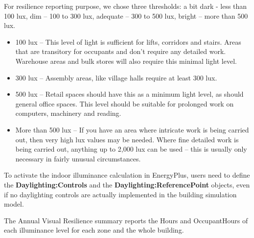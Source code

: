For resilience reporting purpose, we chose three thresholds: a bit dark - less than 100 lux, dim – 100 to 300 lux, adequate – 300 to 500 lux, bright – more than 500 lux.

\begin{itemize}
\item 100 lux – This level of light is sufficient for lifts, corridors and stairs. Areas that are transitory for occupants and don’t require any detailed work. Warehouse areas and bulk stores will also require this minimal light level.
\item 300 lux – Assembly areas, like village halls require at least 300 lux.
\item 500 lux – Retail spaces should have this as a minimum light level, as should general office spaces. This level should be suitable for prolonged work on computers, machinery and reading.
\item More than 500 lux – If you have an area where intricate work is being carried out, then very high lux values may be needed. Where fine detailed work is being carried out, anything up to 2,000 lux can be used – this is usually only necessary in fairly unusual circumstances.
\end{itemize}

To activate the indoor illuminance calculation in EnergyPlus, users need to define the \textbf{Daylighting:Controls} and the \textbf{Daylighting:ReferencePoint} objects, even if no daylighting controls are actually implemented in the building simulation model.

The Annual Visual Resilience summary reports the Hours and OccupantHours of each illuminance level for each zone and the whole building.
